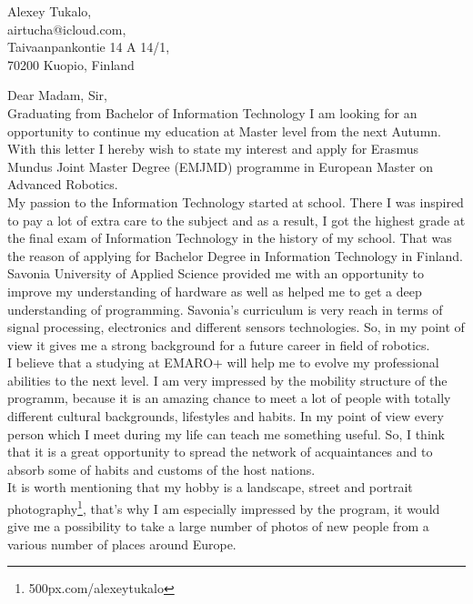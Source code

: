 \documentclass[english]{article}
\date{}
\begin{document}
\begin{flushright}
Alexey Tukalo,\\
airtucha@icloud.com,\\
Taivaanpankontie 14 A 14/1,\\
70200 Kuopio, Finland
\end{flushright}

Dear Madam, Sir,\\ 

Graduating from Bachelor of Information Technology I am looking for an opportunity to continue my education at Master level from the next Autumn. With this letter I hereby wish to state my interest and apply for Erasmus Mundus Joint Master Degree (EMJMD) programme in European Master on Advanced Robotics.\\

My passion to the Information Technology started at school. There I was inspired to pay a lot of extra care to the subject and as a result, I got the highest grade at the final exam of Information Technology in the history of my school. That was the reason of applying for Bachelor Degree in Information Technology in Finland. Savonia University of Applied Science provided me with an opportunity to improve my understanding of hardware as well as helped me to get a deep understanding of programming. Savonia's curriculum is very reach in terms of signal processing, electronics and different sensors technologies. So, in my point of view it gives me a strong background for a future career in field of robotics.\\

I believe that a studying at EMARO+ will help me to evolve my professional abilities to the next level. I am very impressed by the mobility structure of the programm, because it is an amazing chance to meet a lot of people with totally different cultural backgrounds, lifestyles and habits. In my point of view every person which I meet during my life can teach me something useful. So, I think that it is a great opportunity to spread the network of acquaintances and to absorb some of habits and customs of the host nations.\\

It is worth mentioning that my hobby is a landscape, street and portrait photography\footnote{500px.com/alexeytukalo}, that’s why I am especially impressed by the program, it would give me a possibility to take a large number of photos of new people from a various number of places around Europe.\\
\end{document}

